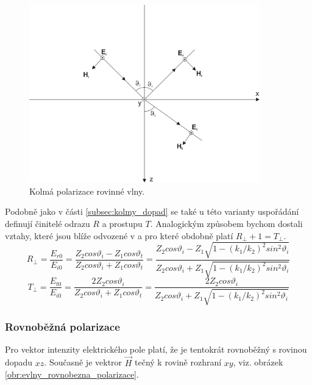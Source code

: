\begin{figure}[!h]
	\centering
	\includegraphics[width=10cm]{evlny_kolma_polarizace.png}
	\caption{Kolmá polarizace rovinné vlny.\cite{emp}}
	\label{obr:evlny_kolma_polarizace}
\end{figure}

Podobně jako v části \ref{subsec:kolmy_dopad} se také u této varianty uspořádání definují činitelé odrazu $R$ a prostupu $T$. Analogickým způsobem bychom dostali vztahy, které jsou blíže odvozené v \cite[str. 94]{emp} a pro které obdobně platí $R_{\perp} + 1 = T_{\perp}$.
\begin{equation}
	R_{\perp} = \frac{E_{r0}}{E_{i0}} = \frac{Z_{2}cos\vartheta_{i}-Z_{1}cos\vartheta_{t}}{Z_{2}cos\vartheta_{i}+Z_{1}cos\vartheta_{t}} = \frac{Z_{2}cos\vartheta_{i}-Z_{1}\sqrt{1-(k_{1}/k_{2})^{2}sin^{2}\vartheta_{i}}}{Z_{2}cos\vartheta_{i}+Z_{1}\sqrt{1-(k_{1}/k_{2})^{2}sin^{2}\vartheta_{i}}}
	\label{rce:evlny_cin_odrazu_kolma}
\end{equation}
\begin{equation}
	T_{\perp} = \frac{E_{t0}}{E_{i0}} = \frac{2Z_{2}cos\vartheta_{i}}{Z_{2}cos\vartheta_{i}+Z_{1}cos\vartheta_{t}} = \frac{2Z_{2}cos\vartheta_{i}}{Z_{2}cos\vartheta_{i}+Z_{1}\sqrt{1-(k_{1}/k_{2})^{2}sin^{2}\vartheta_{i}}}
	\label{rce:evlny_cin_prostupu_kolma}
\end{equation}

\subsubsection*{Rovnoběžná polarizace}
Pro vektor intenzity elektrického pole platí, že je tentokrát rovnoběžný s rovinou dopadu $xz$. Současně je vektror $\vec H$ tečný k rovině rozhraní $xy$, viz. obrázek \ref{obr:evlny_rovnobezna_polarizace}.

